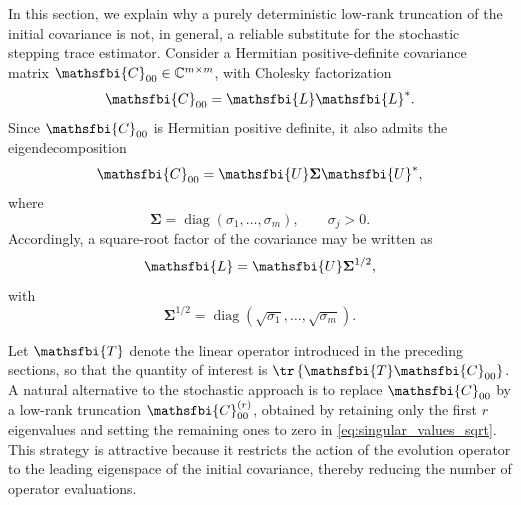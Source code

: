 \begin{appendices}
In this section, we explain why a purely deterministic low-rank truncation of the initial covariance is not, in general, a reliable substitute for the stochastic stepping trace estimator. Consider a Hermitian positive-definite covariance matrix
\(\mathsfbi{C}_{00}\in\mathbb{C}^{m\times m}\), with Cholesky factorization
\begin{equation}
  \mathsfbi{C}_{00}
  =
  \mathsfbi{L}\mathsfbi{L}^{*}.
  \label{eq:C00_cholesky_sste_necessity}
\end{equation}
Since \(\mathsfbi{C}_{00}\) is Hermitian positive definite, it also admits the eigendecomposition
\begin{equation}
  \mathsfbi{C}_{00}
  =
  \mathsfbi{U}\boldsymbol{\Sigma}\mathsfbi{U}^{*},
  \label{eq:C00_eigendecomposition_sste_necessity}
\end{equation}
where
\begin{equation}
  \boldsymbol{\Sigma}
  =
  \operatorname{diag}
  \left(
    \sigma_1,\dots,\sigma_m
  \right),
  \qquad
  \sigma_j>0 .
  \label{eq:C00_eigenvalues_sste_necessity}
\end{equation}
Accordingly, a square-root factor of the covariance may be written as
\begin{equation}
  \mathsfbi{L}
  =
  \mathsfbi{U}\boldsymbol{\Sigma}^{1/2},
  \label{eq:C00_square_root_factor_sste_necessity}
\end{equation}
with
\begin{equation}
  \boldsymbol{\Sigma}^{1/2}
  =
  \operatorname{diag}
  \left(
    \sqrt{\sigma_1},\dots,\sqrt{\sigma_m}
  \right).
  \label{eq:singular_values_sqrt}
\end{equation}

Let \(\mathsfbi{T}\) denote the linear operator introduced in the preceding sections, so that the quantity of interest is
\(\tr\left\{\mathsfbi{T}\mathsfbi{C}_{00}\right\}\). A natural alternative to the stochastic approach is to replace \(\mathsfbi{C}_{00}\) by a low-rank truncation \(\mathsfbi{C}_{00}^{(r)}\), obtained by retaining only the first \(r\) eigenvalues and setting the remaining ones to zero in \eqref{eq:singular_values_sqrt}. This strategy is attractive because it restricts the action of the evolution operator to the leading eigenspace of the initial covariance, thereby reducing the number of operator evaluations.


\end{appendices}
